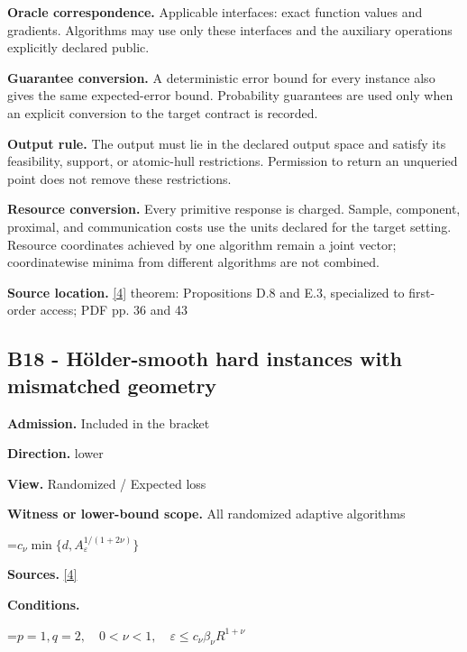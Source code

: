 \documentclass[10pt,a4paper]{article}
\newcommand{\AtlasMath}[1]{\par\begingroup\centering\setbox0=\hbox{$\displaystyle #1$}\ifdim\wd0>1.4\linewidth\typeout{ATLAS WIDE FORMULA: \the\wd0}\fi\ifdim\wd0>\linewidth\resizebox{\linewidth}{!}{\box0}\else\box0\fi\par\endgroup}
\begin{document}
\textbf{Oracle correspondence.} Applicable interfaces: exact function values and gradients. Algorithms may use only these interfaces and the auxiliary operations explicitly declared public.



\textbf{Guarantee conversion.} A deterministic error bound for every instance also gives the same expected-error bound. Probability guarantees are used only when an explicit conversion to the target contract is recorded.



\textbf{Output rule.} The output must lie in the declared output space and satisfy its feasibility, support, or atomic-hull restrictions. Permission to return an unqueried point does not remove these restrictions.



\textbf{Resource conversion.} Every primitive response is charged. Sample, component, proximal, and communication costs use the units declared for the target setting. Resource coordinates achieved by one algorithm remain a joint vector; coordinatewise minima from different algorithms are not combined.



\textbf{Source location.} \href{https://arxiv.org/pdf/2609.32910}{[4]} theorem: Propositions D.8 and E.3, specialized to first-order access; PDF pp. 36 and 43



\subsection{B18 - Hölder-smooth hard instances with mismatched geometry}


\textbf{Admission.} Included in the bracket



\textbf{Direction.} lower



\textbf{View.} Randomized / Expected loss



\textbf{Witness or lower-bound scope.} All randomized adaptive algorithms



\AtlasMath{c_\nu\min\{d,A_\varepsilon^{1/(1+2\nu)}\}}


\textbf{Sources.} \href{https://arxiv.org/pdf/2609.32910}{[4]}



\textbf{Conditions.}
\AtlasMath{p=1,q=2,\quad0<\nu<1,\quad\varepsilon\le c_\nu\beta_\nu R^{1+\nu}}
\end{document}

